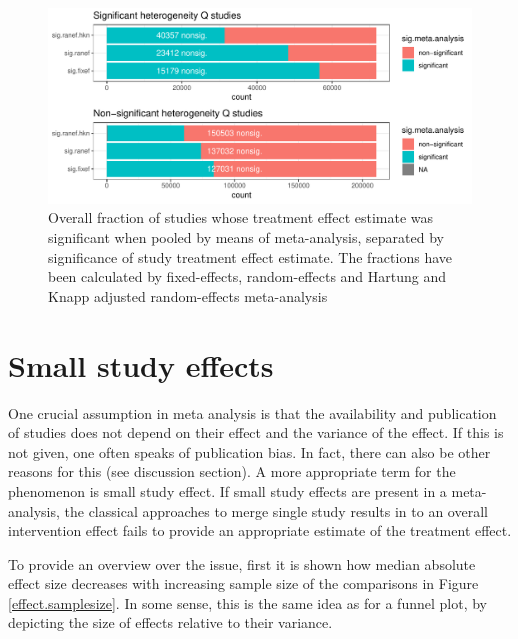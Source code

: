 \documentclass[11pt,a4paper,twoside]{book}\usepackage[]{graphicx}\usepackage[]{color}
\newenvironment{knitrout}{}{} %
\begin{document}
\begin{figure}
\begin{knitrout}
\color{fgcolor}

{\centering \includegraphics[width=\textwidth-3cm]{figure/ch02_figunnamed-chunk-21-1} 

}



\end{knitrout}
\caption{Overall fraction of studies whose treatment effect estimate was significant when pooled by means of meta-analysis, separated by significance of study treatment effect estimate. The fractions have been calculated
by fixed-effects, random-effects and Hartung and Knapp adjusted random-effects meta-analysis}
\label{primary.secondary.significance.sep.sig}
\end{figure}


\section{Small study effects}
One crucial assumption in meta analysis is that the availability and publication of studies does not depend on their effect and the variance of the effect. If this is not given, one often speaks of publication bias. In fact, there can also be other reasons for this (see discussion section). A more appropriate term for the phenomenon is small study effect. If small study effects are present in a meta-analysis, the classical approaches to merge single study results in to an overall intervention effect fails to provide an appropriate estimate of the treatment effect. 

\vspace{0mm}
To provide an overview over the issue, first it is shown how median absolute effect size decreases with increasing sample size of the comparisons in Figure \ref{effect.samplesize}. In some sense, this is the same idea as for a funnel plot, by depicting the size of effects relative to their variance. 
\end{document}
